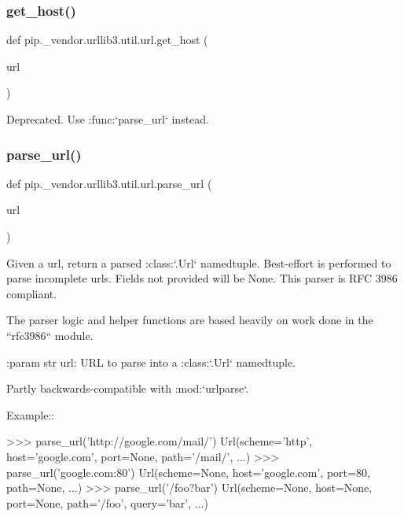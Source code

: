\subsubsection{\texorpdfstring{get\+\_\+host()}{get\_host()}}
{\footnotesize\ttfamily def pip.\+\_\+vendor.\+urllib3.\+util.\+url.\+get\+\_\+host (\begin{DoxyParamCaption}\item[{}]{url }\end{DoxyParamCaption})}

\begin{DoxyVerb}Deprecated. Use :func:`parse_url` instead.
\end{DoxyVerb}
 \mbox{\label{namespacepip_1_1__vendor_1_1urllib3_1_1util_1_1url_a709c0a79b85ca84602eb4bd0ac0fbf79}} 
\subsubsection{\texorpdfstring{parse\+\_\+url()}{parse\_url()}}
{\footnotesize\ttfamily def pip.\+\_\+vendor.\+urllib3.\+util.\+url.\+parse\+\_\+url (\begin{DoxyParamCaption}\item[{}]{url }\end{DoxyParamCaption})}

\begin{DoxyVerb}Given a url, return a parsed :class:`.Url` namedtuple. Best-effort is
performed to parse incomplete urls. Fields not provided will be None.
This parser is RFC 3986 compliant.

The parser logic and helper functions are based heavily on
work done in the ``rfc3986`` module.

:param str url: URL to parse into a :class:`.Url` namedtuple.

Partly backwards-compatible with :mod:`urlparse`.

Example::

    >>> parse_url('http://google.com/mail/')
    Url(scheme='http', host='google.com', port=None, path='/mail/', ...)
    >>> parse_url('google.com:80')
    Url(scheme=None, host='google.com', port=80, path=None, ...)
    >>> parse_url('/foo?bar')
    Url(scheme=None, host=None, port=None, path='/foo', query='bar', ...)
\end{DoxyVerb}
 \mbox{\label{namespacepip_1_1__vendor_1_1urllib3_1_1util_1_1url_a51103aab7c3a6fcb72e7d44eb263bd32}} 
